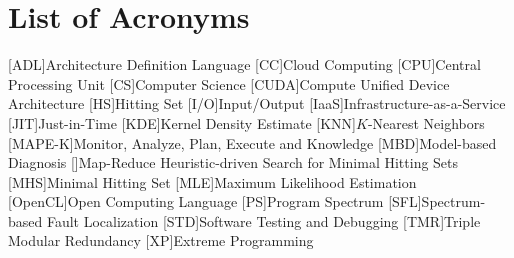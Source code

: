 \renewcommand{\BrainFuckChapter}{
{+}{+}{+}{+}{+}{+}{+}{+}{[}{>}{+}{+}{+}{+}{>}{+}{+}{+}{+}{+}{+}{>}{+}{+}{+}{+}{+}{+}{+}{+}{>}{+}{+}{+}{+}{+}{+}{+}{+}{+}{+}{>}{+}{+}{+}{+}{+}{+}{+}{+}{+}{+}{+}{+}{<}{<}{<}{<}{<}{-}{]}{>}{>}{>}{>}{-}{-}{-}{-}{.}
{>}{+}{+}{+}{+}{+}{+}{+}{+}{+}{.}{+}{+}{+}{+}{+}{+}{+}{+}{+}{+}{.}{+}{.}{<}{<}{<}{<}{.}{>}{>}{>}{>}{-}{-}{-}{-}{-}{.}{-}{-}{-}{-}{-}{-}{-}{-}{-}{.}{<}{<}{<}{<}{.}{>}{>}{+}{.}{>}{>}{-}{-}{-}{.}{+}{+}{+}{+}{+}{+}
{+}{+}{+}{+}{+}{+}{+}{+}{+}{.}{-}{-}{-}{.}{-}{.}{+}{+}{+}{+}{+}{+}{+}{+}{+}{+}{+}{.}{-}{-}{-}{-}{-}{-}{-}{-}{-}{-}{-}{-}{.}{+}{+}{+}{+}{+}{+}{.}{[}{>}{]}{<}{[}{[}{-}{]}{<}{]}{<}{-}{>}{-}{+}{-}{<}{-}{>}{-}{>}{+}
}
\chapter*{List of Acronyms}
\begin{acronym}
  [ADL]{Architecture Definition Language}
  [CC]{Cloud Computing}
  [CPU]{Central Processing Unit}
  [CS]{Computer Science}
  [CUDA]{Compute Unified Device Architecture}
  [HS]{Hitting Set}
  [I/O]{Input/Output}
  [IaaS]{Infrastructure-as-a-Service}
  [JIT]{Just-in-Time}
  [KDE]{Kernel Density Estimate}
  [KNN]{$K$-Nearest Neighbors}
  [MAPE-K]{Monitor, Analyze, Plan, Execute and Knowledge}
  [MBD]{Model-based Diagnosis}
  [\mhsII{}]{Map-Reduce Heuristic-driven Search for Minimal Hitting Sets}
  [MHS]{Minimal Hitting Set}
  [MLE]{Maximum Likelihood Estimation}
  [OpenCL]{Open Computing Language}
  [PS]{Program Spectrum}
  [SFL]{Spectrum-based Fault Localization}
  [STD]{Software Testing and Debugging}
  [TMR]{Triple Modular Redundancy}
  [XP]{Extreme Programming}
\end{acronym}
